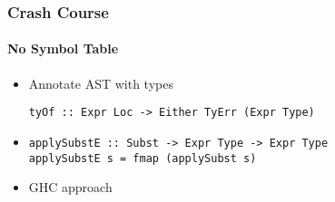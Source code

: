 \documentclass{beamer}
\begin{document}
\begin{frame}[fragile]
  \frametitle{Crash Course}
  \framesubtitle{No Symbol Table}
  \begin{itemize}
      \item Annotate AST with types
        \begin{verbatim}
tyOf :: Expr Loc -> Either TyErr (Expr Type)
        \end{verbatim}
      \item
        \begin{verbatim}
applySubstE :: Subst -> Expr Type -> Expr Type
applySubstE s = fmap (applySubst s)
        \end{verbatim}
      \item GHC approach
  \end{itemize}
\end{frame}


\end{document}
